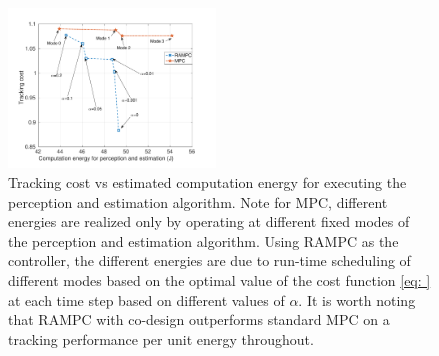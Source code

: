 \begin{figure}[t]
	\centering
	\includegraphics[width=0.49\textwidth,scale=0.7]{figures/TrackingVsEnergy}
        \vspace{-20pt}
	\caption{\small{Tracking cost vs estimated computation energy for executing the perception and estimation algorithm. Note for MPC, different energies are realized only by operating at different fixed modes of the perception and estimation algorithm. Using RAMPC as the controller, the different energies are due to run-time scheduling of different modes based on the optimal value of the cost function \ref{eq: } at each time step based on different values of $\alpha$. It is worth noting that RAMPC with co-design outperforms standard MPC on a tracking performance per unit energy throughout.}}
	\label{fig:modeSwitching}
\end{figure}


